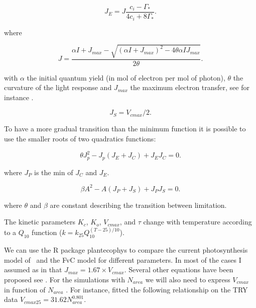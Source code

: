 \documentclass[a4paper,11pt]{article}
\begin{document}
\begin{equation}
\label{eq:JCb}
J_E = J \frac{ c_i - \Gamma_*}{4c_i + 8 \Gamma_*}.
\end{equation}

where

\begin{equation}
\label{eq:Jlight}
J = \frac{ \alpha I + J_{max} - \sqrt{(\alpha I + J_{max})^2 - 4 \theta \alpha I J_{max}}}{2\theta}.
\end{equation}

with $\alpha$ the initial quantum yield (in mol of electron per mol of photon), $\theta$ the curvature of the light response and $J_{max}$ the maximum electron transfer,
see for instance \citet{Bernacchi-2009}.


\begin{equation}
\label{eq:JS}
J_S= V_{cmax}/2.
\end{equation}

To have a more gradual transition than the minimum function it is possible to use the smaller roots of two quadratics functions:

\begin{equation}
\label{eq:Q1}
\theta J_p^2 - J_p(J_E+J_C) + J_E J_C= 0.
\end{equation}

where $J_P$ is the min of $J_C$ and $J_E$.

\begin{equation}
\label{eq:Q2}
\beta A^2 - A(J_P+J_S) + J_P J_S= 0.
\end{equation}

where $\theta$ and $\beta$ are constant describing the transition between limitation.

The kinetic parameters $K_c$, $K_o$, $V_{cmax}$, and $\tau$ change with temperature according to a $Q_{10}$ function ($k = k_{25} Q_{10}^{(T-25)/10}$).

\clearpage

We can use the R package plantecophys \citep{Duursma-2015} to compare the current photosynthesis model of \plant\ and the FvC model for different parameters. In most of the cases I assumed as in \citet{Medlyn-2002} that $J_{max} = 1.67 \times V_{cmax}$. Several other equations have been proposed see \citet{Walker-2014,Kattge-2011}. For the simulations with $N_{area}$ we will also need to express $V_{cmax}$ in function of $N_{area}$ \citep{Kattge-2009,Domingues-2010,Sakschewski-2015}. For instance, \citet{Sakschewski-2015} fitted the following relationship on the TRY data $V_{cmax25} = 31.62 N_{area}^0.801$.
\end{document}
